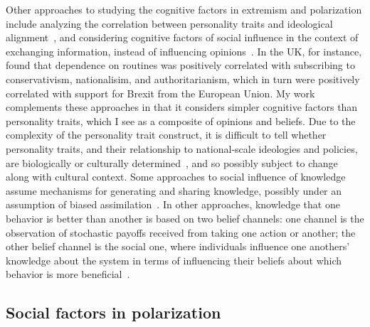 \documentclass[12pt,letterpaper]{article}
\begin{document}
Other approaches to studying the cognitive factors in extremism and polarization
include analyzing the correlation between personality traits and ideological
alignment~\cite{Rollwage2019}, and considering cognitive factors of social influence 
in the context of exchanging information, instead of influencing opinions~\cite{Carley1990,Carley1991,Bala1998}.
In the UK, for instance,  found that dependence on routines was
positively correlated with subscribing to conservativism, nationalisim, and
authoritarianism, which in turn were positively correlated with support for
Brexit from the European Union. My work complements these approaches in that
it considers simpler cognitive factors than personality traits, which I see
as a composite of opinions and beliefs. Due to the complexity of the
personality trait construct, it is difficult to tell whether personality traits,
and their relationship to national-scale ideologies and policies,
are biologically or culturally determined~\cite{Claidiere2012c,Smaldino2019d},
and so possibly subject to change along with cultural context.
Some approaches to social influence of knowledge assume mechanisms for generating and
sharing knowledge, possibly under an assumption of biased 
assimilation~\cite{Mark1998,Mark1998a,Mark2003}. In other approaches, 
knowledge that one behavior is better than another is based on two
belief channels: one channel is the observation of stochastic payoffs 
received from taking one action or another; the other belief channel is 
the social one, where individuals influence one anothers' knowledge about
the system in terms of influencing their beliefs about which behavior is
more beneficial~\cite{Zollman2007,OConnor2019e}.




\subsection{Social factors in polarization}
\end{document}
